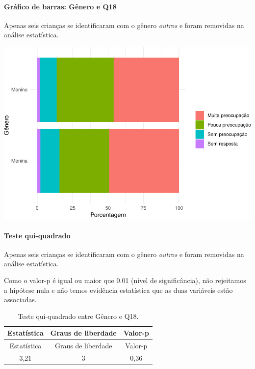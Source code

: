 \documentclass[]{article}
\let\oldparagraph\paragraph
\renewcommand{\paragraph}[1]{\oldparagraph{#1}\mbox{}}
\begin{document}
\hypertarget{gruxe1fico-de-barras-guxeanero-e-q18}{%
\paragraph{Gráfico de barras: Gênero e Q18}\label{gruxe1fico-de-barras-guxeanero-e-q18}}

Apenas seis crianças se identificaram com o gênero \emph{outros} e foram removidas na análise estatística.

\begin{center}\includegraphics[width=0.75\linewidth]{relatorio_covid19_files/figure-latex/unnamed-chunk-259-1} \end{center}

\hypertarget{teste-qui-quadrado-23}{%
\paragraph{Teste qui-quadrado}\label{teste-qui-quadrado-23}}

Apenas seis crianças se identificaram com o gênero \emph{outros} e foram removidas na análise estatística.

Como o valor-p é igual ou maior que 0.01 (nível de significância), não rejeitamos a hipótese nula e não temos evidência estatística que as duas variáveis estão associadas.

\begin{longtable}[]{@{}ccc@{}}
\caption{\label{tab:unnamed-chunk-261}Teste qui-quadrado entre Gênero e Q18.}\tabularnewline
\toprule
Estatística & Graus de liberdade & Valor-p\tabularnewline
\midrule
\endfirsthead
\toprule
Estatística & Graus de liberdade & Valor-p\tabularnewline
\midrule
\endhead
3,21 & 3 & 0,36\tabularnewline
\bottomrule
\end{longtable}

\cleardoublepage
\end{document}
